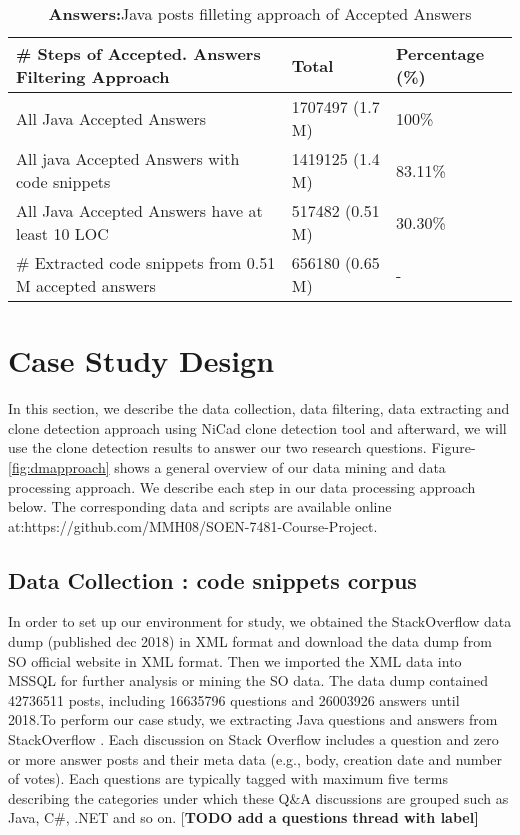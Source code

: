 \documentclass[conference]{IEEEtran}
\begin{document}
	
	\begin{table*}[ht]
		\caption{\textbf{Answers:}Java posts filleting approach of Accepted Answers}
		\centering
		\begin{tabular}{l l l }
			\hline\hline
			\# Steps of Accepted. Answers Filtering Approach & Total & Percentage (\%) \\ [0.5ex]
			\hline
			All Java Accepted Answers & 1707497 (1.7 M) & 100\% \\
			All java Accepted Answers with code snippets & 1419125 (1.4 M) & 83.11\% \\
			All Java Accepted Answers have at least 10 LOC  & 517482 (0.51 M) & 30.30\% \\
			\# Extracted code snippets from 0.51 M accepted answers & 656180 (0.65 M) & - \\  [1ex]
			\hline
		\end{tabular}
		\label{table:JavaAnswers}
	\end{table*}
	
	\section{Case Study Design}
	In this section, we describe the data collection, data filtering, data extracting and clone detection approach using NiCad clone detection tool and afterward, we will use the clone detection results to answer our two research questions. Figure-\ref{fig:dmapproach} shows a general overview of our data mining and data processing approach. We describe each step in our data processing approach below. The corresponding data and scripts are available online at:https://github.com/MMH08/SOEN-7481-Course-Project.
	

	
	
	\subsection{Data Collection : code snippets corpus}
	In order to set up our environment for study, we obtained the StackOverflow data dump  (published dec 2018) in XML format and download the data dump from SO official website in XML format. Then we imported the XML data into MSSQL for further analysis or mining the SO data. The data dump contained 42736511 posts, including 16635796 questions and 26003926 answers until 2018.To perform our case study, we extracting Java questions and answers from StackOverflow . Each discussion on Stack Overflow includes a question and zero or more answer posts and their meta data (e.g., body, creation date and number of votes). Each questions are typically tagged with maximum five terms describing the categories under which these Q\&A discussions are grouped such as Java, C\#, .NET and so on. [\textbf{TODO add a questions thread with label]}
	
\end{document}
